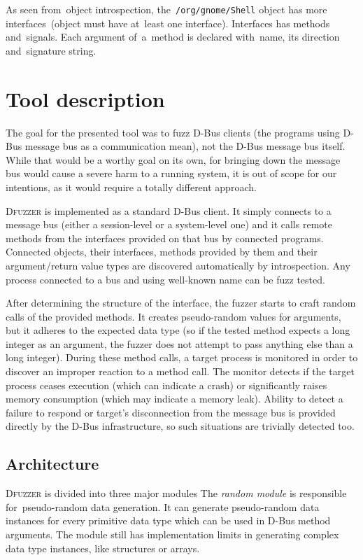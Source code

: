 \documentclass[conference]{IEEEtran}
\begin{document}
\noindent
As seen from~object introspection, the~\texttt{/org/gnome/Shell} object has
more interfaces~(object must have at~least one interface). Interfaces has methods
and~signals. Each argument of~a~method is declared with~name, its direction
and~signature string.


\section{Tool description}
The goal for the presented tool was to fuzz D-Bus clients (the programs using
D-Bus message bus as a communication mean), not the D-Bus message bus itself. While
that would be a worthy goal on its own, for bringing down the message bus
would cause a severe harm to a running system, it is out of scope for our
intentions, as it would require a totally different approach.

\textsc{Dfuzzer} is implemented as a standard D-Bus client. It simply connects
to a message bus (either a session-level or a system-level one) and it calls
remote methods from the interfaces provided on that bus by connected programs.
Connected objects, their interfaces, methods provided by them and their
argument/return value types are discovered automatically by introspection. Any
process connected to a bus and using well-known name can be fuzz tested.

After determining the structure of the interface, the fuzzer starts to craft
random calls of the provided methods. It creates pseudo-random values for
arguments, but it adheres to the expected data type (so if the tested method
expects a long integer as an argument, the fuzzer does not attempt to pass
anything else than a long integer). During these method calls, a target process
is monitored in order to discover an improper reaction to a method call. The
monitor detects if the target process ceases execution (which can indicate a
crash) or significantly raises memory consumption (which may indicate a memory
leak). Ability to detect a failure to respond or target's disconnection from the
message bus is provided directly by the D-Bus infrastructure, so such situations
are trivially detected too.


\subsection{Architecture}
\textsc{Dfuzzer} is divided into three major modules The \emph{random module} is
responsible for~pseudo-random data generation. It can generate pseudo-random
data instances for every primitive data type which can be used in D-Bus method
arguments. The module still has implementation limits in generating complex data
type instances, like structures or arrays.
\end{document}
